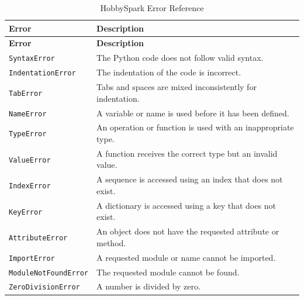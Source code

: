 \documentclass[11pt]{book}
\begin{document}
\begin{longtable}{p{} p{}}

    \caption{HobbySpark Error Reference}
    \label{tab:error-reference} \\

    \toprule
    \textbf{Error} & \textbf{Description} \\
    \midrule
    \endfirsthead

    \toprule
    \textbf{Error} & \textbf{Description} \\
    \midrule
    \endhead

    \bottomrule
    \endfoot

    \texttt{SyntaxError} &
    The Python code does not follow valid syntax. \\

    \texttt{IndentationError} &
    The indentation of the code is incorrect. \\

    \texttt{TabError} &
    Tabs and spaces are mixed inconsistently for indentation. \\

    \texttt{NameError} &
    A variable or name is used before it has been defined. \\

    \texttt{TypeError} &
    An operation or function is used with an inappropriate type. \\

    \texttt{ValueError} &
    A function receives the correct type but an invalid value. \\

    \texttt{IndexError} &
    A sequence is accessed using an index that does not exist. \\

    \texttt{KeyError} &
    A dictionary is accessed using a key that does not exist. \\

    \texttt{AttributeError} &
    An object does not have the requested attribute or method. \\

    \texttt{ImportError} &
    A requested module or name cannot be imported. \\

    \texttt{ModuleNotFoundError} &
    The requested module cannot be found. \\

    \texttt{ZeroDivisionError} &
    A number is divided by zero. \\


\end{longtable}
\end{document}

